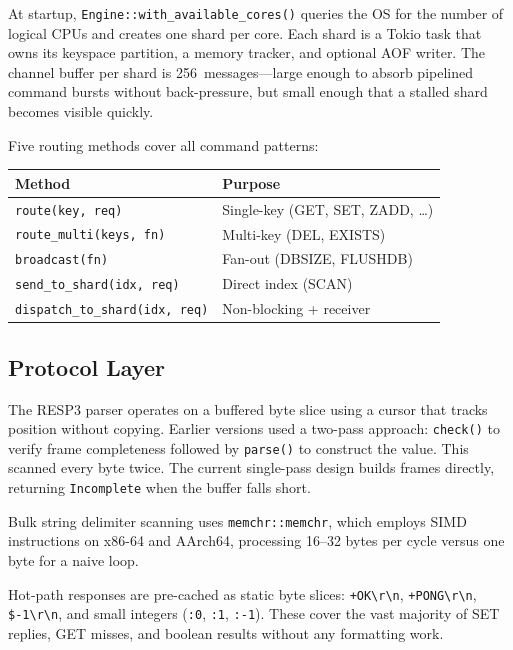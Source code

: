 \documentclass[conference]{IEEEtran}
\begin{document}
At startup, \texttt{Engine::with\_available\_cores()} queries the OS
for the number of logical CPUs and creates one shard per core.
Each shard is a Tokio task that owns its keyspace partition, a memory
tracker, and optional AOF writer. The channel buffer per shard is
256~messages---large enough to absorb pipelined command bursts without
back-pressure, but small enough that a stalled shard becomes visible
quickly.

Five routing methods cover all command patterns:

\smallskip
\begin{tabular}{@{}ll@{}}
\toprule
\textbf{Method} & \textbf{Purpose} \\
\midrule
\texttt{route(key, req)} & Single-key (GET, SET, ZADD, \ldots) \\
\texttt{route\_multi(keys, fn)} & Multi-key (DEL, EXISTS) \\
\texttt{broadcast(fn)} & Fan-out (DBSIZE, FLUSHDB) \\
\texttt{send\_to\_shard(idx, req)} & Direct index (SCAN) \\
\texttt{dispatch\_to\_shard(idx, req)} & Non-blocking + receiver \\
\bottomrule
\end{tabular}
\smallskip

\subsection{Protocol Layer}

The RESP3 parser operates on a buffered byte slice using a cursor
that tracks position without copying. Earlier versions used a
two-pass approach: \texttt{check()} to verify frame completeness
followed by \texttt{parse()} to construct the value. This scanned
every byte twice. The current single-pass design builds frames
directly, returning \texttt{Incomplete} when the buffer falls short.

Bulk string delimiter scanning uses \texttt{memchr::memchr}, which
employs SIMD instructions on x86-64 and AArch64, processing 16--32
bytes per cycle versus one byte for a naive loop.

Hot-path responses are pre-cached as static byte slices:
\texttt{+OK\textbackslash r\textbackslash n},
\texttt{+PONG\textbackslash r\textbackslash n},
\texttt{\$-1\textbackslash r\textbackslash n}, and small integers
(\texttt{:0}, \texttt{:1}, \texttt{:-1}). These cover the vast
majority of SET replies, GET misses, and boolean results without any
formatting work.
\end{document}
